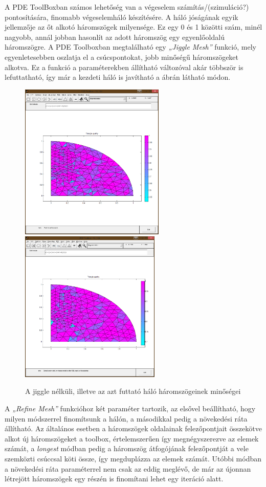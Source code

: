 A PDE ToolBoxban számos lehetőség van a végeselem számítás/(szimuláció?) pontosítására, finomabb végeselemháló készítésére. A háló jóságának egyik jellemzője az őt alkotó háromszögek milyensége. Ez egy 0 és 1 közötti szám, minél nagyobb, annál jobban hasonlít az adott háromszög egy egyenlőoldalú háromszögre. A PDE Toolboxban megtalálható egy \textit{„Jiggle Mesh”} funkció, mely egyenletesebben oszlatja el a csúcspontokat, jobb minőségű háromszögeket alkotva. Ez a funkció a paraméterekben állítható változóval akár többször is lefuttatható, így már a kezdeti háló is javítható a  ábrán látható módon.
\begin{figure}[!h]
	\centering
	\includegraphics[trim = 25mm 50mm 10mm 70mm,clip, width=69mm, keepaspectratio]{figures/terek/nl_1_3szog0.png}\hspace{5mm}
	\includegraphics[trim = 25mm 50mm 10mm 70mm,clip, width=67mm, keepaspectratio]{figures/terek/nl_1_3szog1.png}
	\caption{A jiggle nélküli, illetve az azt futtató háló háromszögeinek minőségei}
	\label{fig:jiggle}
\end{figure}

A \textit{„Refine Mesh”} funkcióhoz két paraméter tartozik, az elsővel beállítható, hogy milyen módszerrel finomítsunk a hálón, a másodikkal pedig a növekedési ráta állítható. Az általános esetben a háromszögek oldalainak felezőpontjait összekötve alkot új háromszögeket a toolbox, értelemszerűen így megnégyszerezve az elemek számát, a \textit{longest} módban pedig a háromszög átfogójának felezőpontját a vele szemközti csúccsal köti össze, így megduplázza az elemek számát. Utóbbi módban a növekedési ráta paraméterrel nem csak az eddig meglévő, de már az újonnan létrejött háromszögek egy részén is finomítani lehet egy iteráció alatt.

